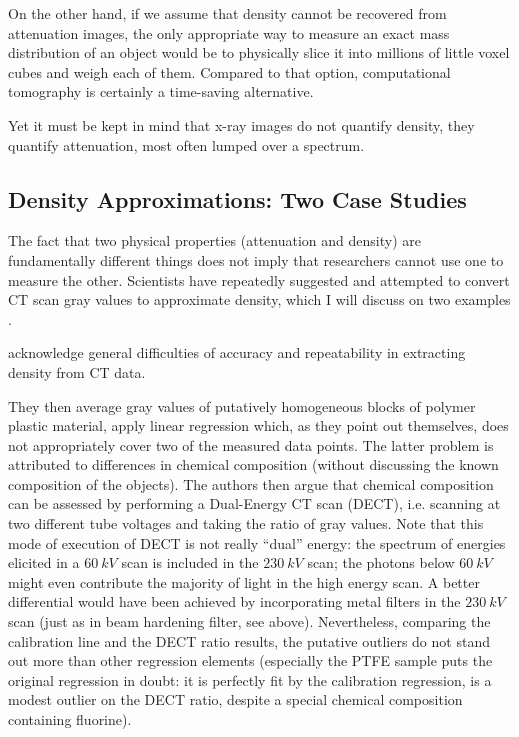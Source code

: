 On the other hand, if we assume that density cannot be recovered from attenuation images, the only appropriate way to measure an exact mass distribution of an object would be to physically slice it into millions of little voxel cubes and weigh each of them.
Compared to that option, computational tomography is certainly a time-saving alternative.


Yet it must be kept in mind that x-ray images do not quantify density, they quantify attenuation, most often lumped over a spectrum.


\subsection{Density Approximations: Two Case Studies}
\label{sec:org346838a}
The fact that two physical properties (attenuation and density) are fundamentally different things does not imply that researchers cannot use one to measure the other.
Scientists have repeatedly suggested and attempted to convert CT scan gray values to approximate density, which I will discuss on two examples \citep{DuPlessis2013,Durston2022}.


\citet{DuPlessis2013} acknowledge general difficulties of accuracy and repeatability in extracting density from CT data.

They then average gray values of putatively homogeneous blocks of polymer plastic material, apply linear regression which, as they point out themselves, does not appropriately cover two of the measured data points.
The latter problem is attributed to differences in chemical composition (without discussing the known composition of the objects).
The authors then argue that chemical composition can be assessed by performing a Dual-Energy CT scan (DECT), i.e. scanning at two different tube voltages and taking the ratio of gray values.
Note that this mode of execution of DECT is not really ``dual'' energy: the spectrum of energies elicited in a \(60\ kV\) scan is included in the \(230\ kV\) scan; the photons below \(60\ kV\) might even contribute the majority of light in the high energy scan.
A better differential would have been achieved by incorporating metal filters in the \(230\ kV\) scan (just as in beam hardening filter, see above).
Nevertheless, comparing the calibration line and the DECT ratio results, the putative outliers do not stand out more than other regression elements (especially the PTFE sample puts the original regression in doubt: it is perfectly fit by the calibration regression, is a modest outlier on the DECT ratio, despite a special chemical composition containing fluorine).

